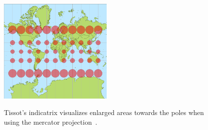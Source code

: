\begin{figure}[h]
  \begin{center}
    \includegraphics[width=0.5\textwidth]{figures/tissot_mercator.png}
    \label{fig:mercator}
    \caption{Tissot's indicatrix visualizes enlarged areas towards the poles when using the mercator projection~\cite{wiki:mercator}.}
  \end{center}
\end{figure}
   




























